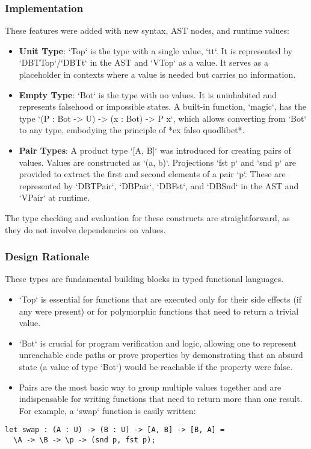 \subsubsection{Implementation}
These features were added with new syntax, AST nodes, and runtime values:
\begin{itemize}
    \item \textbf{Unit Type}: `Top` is the type with a single value, `tt`. It is represented by `DBTTop`/`DBTt` in the AST and `VTop` as a value. It serves as a placeholder in contexts where a value is needed but carries no information.
    \item \textbf{Empty Type}: `Bot` is the type with no values. It is uninhabited and represents falsehood or impossible states. A built-in function, `magic`, has the type `(P : Bot -> U) -> (x : Bot) -> P x`, which allows converting from `Bot` to any type, embodying the principle of *ex falso quodlibet*.
    \item \textbf{Pair Types}: A product type `[A, B]` was introduced for creating pairs of values. Values are constructed as `(a, b)`. Projections `fst p` and `snd p` are provided to extract the first and second elements of a pair `p`. These are represented by `DBTPair`, `DBPair`, `DBFst`, and `DBSnd` in the AST and `VPair` at runtime.
\end{itemize}
The type checking and evaluation for these constructs are straightforward, as they do not involve dependencies on values.

\subsubsection{Design Rationale}
These types are fundamental building blocks in typed functional languages.
\begin{itemize}
    \item `Top` is essential for functions that are executed only for their side effects (if any were present) or for polymorphic functions that need to return a trivial value.
    \item `Bot` is crucial for program verification and logic, allowing one to represent unreachable code paths or prove properties by demonstrating that an absurd state (a value of type `Bot`) would be reachable if the property were false.
    \item Pairs are the most basic way to group multiple values together and are indispensable for writing functions that need to return more than one result. For example, a `swap` function is easily written:
\end{itemize}
\begin{verbatim}
let swap : (A : U) -> (B : U) -> [A, B] -> [B, A] =
  \A -> \B -> \p -> (snd p, fst p);
\end{verbatim}

